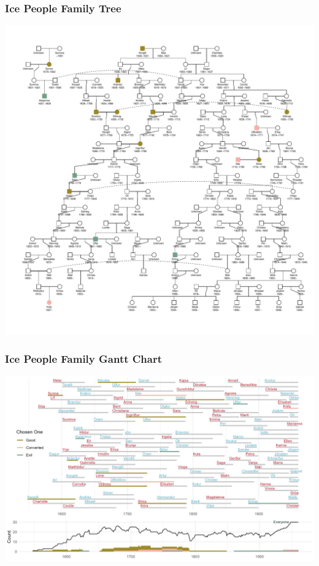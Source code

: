 \begin{frame}
    \frametitle{Ice People Family Tree}
    \centering
    \includegraphics[height=\textheight]{../R/figures/family_tree}
\end{frame}

\begin{frame}
    \frametitle{Ice People Family Gantt Chart}
    \centering
    \includegraphics[width=\textheight]{../R/figures/family_gantt}
\end{frame}


